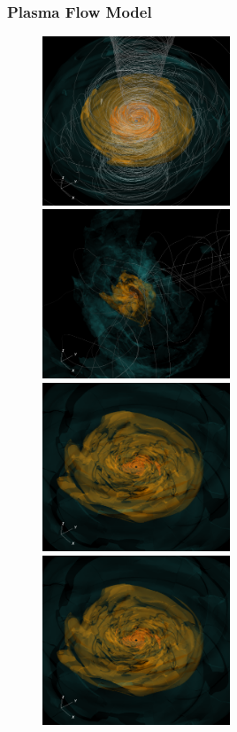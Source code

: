 \subsubsection{Plasma Flow Model}

\begin{figure}
  \centering
  \includegraphics[width=0.5\textwidth]{figures/sane_3D.png}%
  \includegraphics[width=0.5\textwidth]{figures/ressler_3D.png}\\
  \includegraphics[width=0.5\textwidth]{figures/mad_3D.png}%
  \includegraphics[width=0.5\textwidth]{figures/mad_3D.png}

\end{figure}
